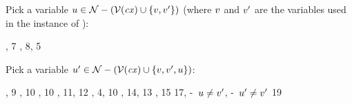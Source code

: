 \begin{bycase}
\Case{\Rstarr}
\begin{derivation}
\step{\istyO{\typ}}{\premof{\Rstarr}}
\end{derivation}
Pick a variable $u\in\mathcal{N}-(\mathcal{V}(\mathit{cx})\cup\{v,v'\})$ (where $v$
and $v'$ are the variables used in the instance of \Rstarr):
\begin{derivatioN}{7}
     {\RcxvdecI, 7}
     {, 8, 5}
\end{derivatioN}
Pick a variable $u'\in\mathcal{N}-(\mathcal{V}(\mathit{cx})\cup\{v,v',u\})$:
\begin{derivatioN}{9}
     {\RcxvdecI, 9}
     {\Revar, 10}
     {\Revar, 10}
     {\Reapp, 11, 12}
     {, 4, 10}
     {\Reapp, 14, 13}
     {\Reabs, 15}
     {17, \hyp\ $u\neq v'$, \hyp\ $u'\neq v'$}
\steP
{
 \linK{=}
 \cup{}\cup{}
 \emptyset}
     {19}

\end{derivatioN}
\end{bycase}
